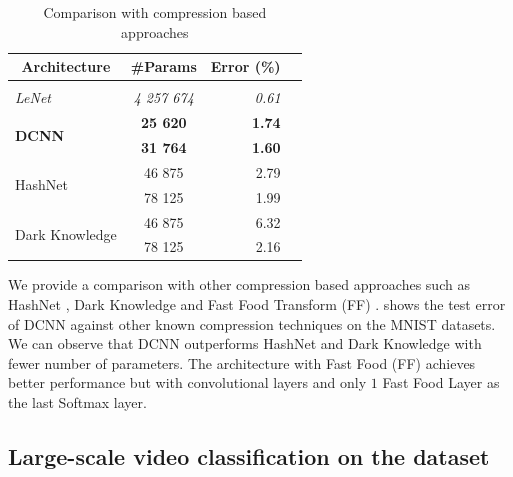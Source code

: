 \begin{table}
  \centering
    \caption{Comparison with compression based approaches}
    \begin{tabular}{lcrc}
    \toprule
    \multicolumn{1}{c}{\textbf{Architecture}} & \multicolumn{1}{c}{\textbf{\#Params}} & \textbf{Error (\%)} \\
    \hline \\
    \textit{LeNet \cite{Lecun98gradient-basedlearning}} & \textit{4 257 674} & \textit{0.61} \\
    \multirow{2}[0]{*}{\textbf{DCNN}} & \textbf{25 620} & \textbf{1.74} \\
          & \textbf{31 764} & \textbf{1.60} \\
    \multirow{2}[0]{*}{HashNet \cite{chen2015compressing}} & 46 875 & 2.79 \\
          &  78 125 & 1.99 \\
    \multirow{2}[0]{*}{Dark Knowledge \cite{hinton2015distilling}} & 46 875 & 6.32 \\
          &  78 125 & 2.16 \\
    \bottomrule
    \end{tabular}%
  \label{tab:mnist}%
\end{table}%


We provide a comparison with other compression based approaches such as HashNet \cite{chen2015compressing}, Dark Knowledge \cite{hinton2015distilling} and Fast Food Transform (FF) \cite{yang2015deep}. 
 shows the test error of DCNN against other known compression techniques on the MNIST datasets.
We can observe that DCNN outperforms HashNet \cite{chen2015compressing} and Dark Knowledge \cite{hinton2015distilling} with fewer number of parameters.
The architecture with Fast Food (FF) \cite{yang2015deep} achieves better performance but with convolutional layers and only $1$ Fast Food Layer as the last Softmax layer. 

\subsection{Large-scale video classification on the \yt dataset}
\label{subsection:ch4-large_scale_video_classification}

